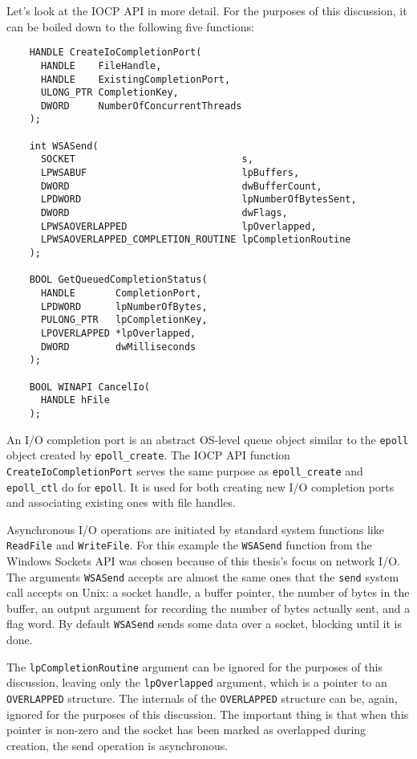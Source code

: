 \documentclass[a4paper,11pt,oneside]{report}
\begin{document}
Let's look at the IOCP API in more detail. For the purposes of this discussion,
it can be boiled down to the following five functions:

\begin{verbatim}
    HANDLE CreateIoCompletionPort(
      HANDLE    FileHandle,
      HANDLE    ExistingCompletionPort,
      ULONG_PTR CompletionKey,
      DWORD     NumberOfConcurrentThreads
    );

    int WSASend(
      SOCKET                             s,
      LPWSABUF                           lpBuffers,
      DWORD                              dwBufferCount,
      LPDWORD                            lpNumberOfBytesSent,
      DWORD                              dwFlags,
      LPWSAOVERLAPPED                    lpOverlapped,
      LPWSAOVERLAPPED_COMPLETION_ROUTINE lpCompletionRoutine
    );

    BOOL GetQueuedCompletionStatus(
      HANDLE       CompletionPort,
      LPDWORD      lpNumberOfBytes,
      PULONG_PTR   lpCompletionKey,
      LPOVERLAPPED *lpOverlapped,
      DWORD        dwMilliseconds
    );

    BOOL WINAPI CancelIo(
      HANDLE hFile
    );
\end{verbatim}

An I/O completion port is an abstract OS-level queue object similar to the
\texttt{epoll} object created by \texttt{epoll\_create}. The IOCP API function
\texttt{CreateIoCompletionPort} serves the same purpose as
\texttt{epoll\_create} and \texttt{epoll\_ctl} do for \texttt{epoll}. It is used
for both creating new I/O completion ports and associating existing ones with
file handles.

Asynchronous I/O operations are initiated by standard system functions like
\texttt{ReadFile} and \texttt{WriteFile}. For this example the \texttt{WSASend}
function from the Windows Sockets API was chosen because of this thesis's focus
on network I/O. The arguments \texttt{WSASend} accepts are almost the same ones
that the \texttt{send} system call accepts on Unix: a socket handle, a buffer
pointer, the number of bytes in the buffer, an output argument for recording the
number of bytes actually sent, and a flag word. By default \texttt{WSASend}
sends some data over a socket, blocking until it is done.

The \texttt{lpCompletionRoutine} argument can be ignored for the purposes of
this discussion, leaving only the \texttt{lpOverlapped} argument, which is a
pointer to an \texttt{OVERLAPPED} structure. The internals of the
\texttt{OVERLAPPED} structure can be, again, ignored for the purposes of this
discussion. The important thing is that when this pointer is non-zero and the
socket has been marked as overlapped during creation, the send operation is
asynchronous.
\end{document}
